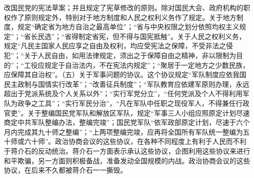 \begin{maonote}
改国民党的宪法草案；并且规定了宪草修改的原则。除对国民大会、政府机构的职权作了原则规定外，特别对于地方制度和人民之权利义务作了规定。关于地方制度，规定“确定省为地方自治之最高单位”；“省与中央权限之划分依照均权主义规定”；“省长民选”；“省得制定省宪，但不得与国宪抵触”。关于人民之权利义务，规定“凡民主国家人民应享之自由及权利，均应受宪法之保障，不受非法之侵犯”；“关于人民自由，如用法律规定，须出之于保障自由之精神，非以限制为目的”；“工役应规定于自治法内，不在宪法内规定”；“聚居于一定地方之少数民族，应保障其自治权”。（五）关于军事问题的协议。这个协议规定“军队制度应依我国民主政制与国情实行改革”；“改善征兵制度”；“军队教育应依建军原则办理，永远超出于党派系统及个人关系以外”；“实行军党分立”，“任何党派及个人不得利用军队为政争之工具”；“实行军民分治”，“凡在军队中任职之现役军人，不得兼任行政官吏”。关于整编国民党军队和解放区军队，规定“军事三人小组应照原定计划尽速商定中共军队整编办法，整编完竣”；国民党军队“依军政部原定计划，尽速于六个月内完成其九十师之整编”；“上两项整编完竣，应再将全国所有军队统一整编为五十师或六十师”。政治协商会议的这些协议，在各种不同程度上有利于人民而不利于蒋介石的反动统治。蒋介石一方面表示承认这些协议，企图利用这些协议来进行和平欺骗，另一方面则积极备战，准备发动全国规模的内战。政治协商会议的这些协议，在后来不久都被蒋介石一一撕毁。
\end{maonote}
